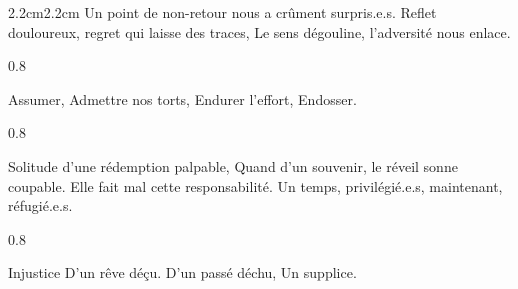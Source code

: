 \begin{adjustwidth}{2.2cm}{2.2cm}
\newline Un point de non-retour nous a crûment surpris.e.s.
\newline Reflet douloureux, regret qui laisse des traces,
\newline Le sens dégouline, l’adversité nous enlace.
\begin{spacing}{0.8}
~
\end{spacing}
\noindent Assumer,
\newline Admettre nos torts,
\newline Endurer l’effort,
\newline Endosser.
\begin{spacing}{0.8}
~
\end{spacing}
\noindent Solitude d’une rédemption palpable,
\newline Quand d’un souvenir, le réveil sonne coupable.
\newline Elle fait mal cette responsabilité.
\newline Un temps, privilégié.e.s, maintenant, réfugié.e.s.
\begin{spacing}{0.8}
~
\end{spacing}
\noindent Injustice
\newline \noindent D’un rêve déçu.
\newline \noindent D’un passé déchu,
\newline \noindent Un supplice.


\end{adjustwidth}
